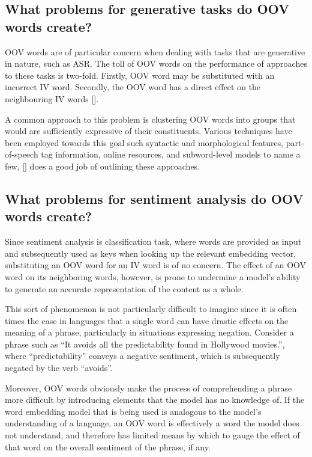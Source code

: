 \documentclass[12pt, a4paper]{report}
\theoremstyle{definition}
\theoremstyle{definition}%
\theoremstyle{definition}%
\theoremstyle{definition}%
\theoremstyle{definition}%
\theoremstyle{definition}%
\renewcommand{\cite}[1]{[\citealp{#1}]}
\begin{document}
\subsection{What problems for generative tasks do OOV words create?}
OOV words are of particular concern when dealing with tasks that are generative in nature, such as ASR. The toll of OOV words on the performance of approaches to these tasks is two-fold. Firstly, OOV word may be substituted with an incorrect IV word. Secondly, the OOV word has a direct effect on the neighbouring IV words \cite{naptali2012}.

A common approach to this problem is clustering OOV words into groups that would are sufficiently expressive of their constituents. Various techniques have been employed towards this goal such syntactic and morphological features, part-of-speech tag information, online resources, and subword-level models to name a few, \cite{naptali2012} does a good job of outlining these approaches. 

\subsection{What problems for sentiment analysis do OOV words create?}
Since sentiment analysis is classification task, where words are provided as input and subsequently used as keys when looking up the relevant embedding vector, substituting an OOV word for an IV word is of no concern. The effect of an OOV word on its neighboring words, however, is prone to undermine a model's ability to generate an accurate representation of the content as a whole. 

This sort of phenomenon is not particularly difficult to imagine since it is often times the case in languages that a single word can have drastic effects on the meaning of a phrase, particularly in situations expressing negation. Consider a phrase such as \enquote{It avoids all the predictability found in Hollywood movies.}, where \enquote{predictability} conveys a negative sentiment, which is subsequently negated by the verb \enquote{avoids}.

Moreover, OOV words obviously make the process of comprehending a phrase more difficult by introducing elements that the model has no knowledge of. If the word embedding model that is being used is analogous to the model's understanding of a language, an OOV word is effectively a word the model does not understand, and therefore has limited means by which to gauge the effect of that word on the overall sentiment of the phrase, if any.
\end{document}
